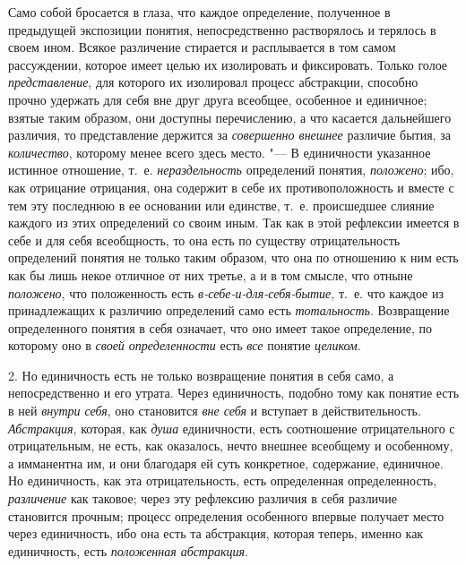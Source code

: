 Само собой бросается в глаза, что каждое определение,
полученное в предыдущей экспозиции понятия, непосредственно растворялось и
терялось в своем ином. Всякое различение стирается и расплывается в том
самом рассуждении, которое имеет целью их изолировать и фиксировать. Только
голое {\em представление},
для которого их изолировал процесс абстракции, способно
прочно удержать для себя вне друг друга всеобщее, особенное и единичное;
взятые таким образом, они доступны перечислению, а что касается дальнейшего
различия, то представление держится за
{\em совершенно внешнее}
различие бытия, за
{\em количество},
которому менее всего здесь место. "--- В
единичности указанное истинное отношение, т.~е.
{\em нераздельность}
определений понятия,
{\em положено}; ибо, как
отрицание отрицания, она содержит в себе их противоположность и вместе с
тем эту последнюю в ее основании или единстве, т.~е. происшедшее слияние
каждого из этих определений со своим иным. Так как в этой рефлексии
имеется в себе и для себя всеобщность, то она есть по существу
отрицательность определений понятия не только таким образом, что она по
отношению к ним есть как бы лишь некое отличное от них третье, а и в том
смысле, что отныне {\em положено},
что положенность есть
{\em в-себе-и-для-себя-бытие},
т.~е. что каждое из принадлежащих к различию определений само
есть {\em тотальность}.
Возвращение определенного понятия в себя означает, что оно
имеет такое определение, по которому оно в
{\em своей определенности}
есть {\em все} понятие {\em целиком}.

2. Но единичность есть не только возвращение понятия в себя
само, а непосредственно и его утрата. Через единичность, подобно тому как
понятие есть в ней
{\em внутри себя}, оно
становится {\em вне себя}
и вступает в действительность.
{\em Абстракция},
которая, как {\em душа}
единичности, есть соотношение отрицательного с отрицательным,
не есть, как оказалось, нечто внешнее всеобщему и особенному, а имманентна
им, и они благодаря ей суть конкретное, содержание, единичное. Но
единичность, как эта отрицательность, есть определенная определенность,
{\em различение} как
таковое; через эту рефлексию различия в себя различие становится прочным;
процесс определения особенного впервые получает место через единичность,
ибо она есть та абстракция, которая теперь, именно как единичность, есть
{\em положенная абстракция}.

